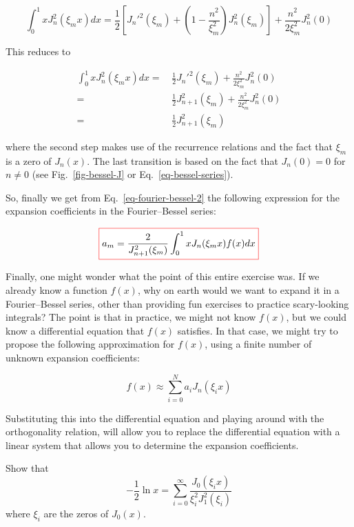\begin{equation}
\int_0^1 x J_n^2(\xi_m x) dx = \frac{1}{2}\left[{J_n'^2(\xi_m) + \left(1 - \frac{n^2}{\xi_m^2}\right) J_n^2(\xi_m)}\right] + \frac{n^2}{2\xi_m^2} J_n^2(0)
\end{equation} 

This reduces to

\begin{align}
\int_0^1 x J_n^2(\xi_m x) dx =& \, \frac{1}{2}J_n'^2(\xi_m) + \frac{n^2}{2\xi_m^2} J_n^2(0) \nonumber \\
 =& \, \frac{1}{2}J_{n+1}^2(\xi_m) + \frac{n^2}{2\xi_m^2} J_n^2(0) \nonumber \\
 =& \, \frac{1}{2}J_{n+1}^2(\xi_m)
\end{align} 

where the second step makes use of the recurrence relations and the fact that $\xi_m$ is a zero of $J_n(x)$. The last transition is based on the fact that $J_n(0)=0$ for $n \ne 0$ (see Fig.~\ref{fig-bessel-J} or Eq.~\ref{eq-bessel-series}).

So, finally we get from Eq.~\ref{eq-fourier-bessel-2} the following expression for the expansion coefficients in the Fourier--Bessel series:

\begin{equation}
\fbox{$\displaystyle
a_m = \frac{2}{J_{n+1}^2(\xi_m)}\int_0^1 x J_n(\xi_m x) f(x) dx
$}
\end{equation} 

Finally, one might wonder what the point of this entire exercise was. If we already know a function $f(x)$, why on earth would we want to expand it in a Fourier--Bessel series, other than providing fun exercises to practice scary-looking integrals? The point is that in practice, we might not know $f(x)$, but we could know a differential equation that $f(x)$ satisfies. In that case, we might try to propose the following approximation for $f(x)$, using a finite number of unknown expansion coefficients:

\begin{equation}
f(x) \approx \sum_{i=0}^{N} a_i J_n(\xi_i x)
\end{equation} 

Substituting this into the differential equation and playing around with the orthogonality relation, will allow you to replace the differential equation with a linear system that allows you to determine the expansion coefficients.

\begin{exer}
Show that
$$-\frac{1}{2} \ln x = \sum_{i=0}^{\infty} \frac{J_0(\xi_i x)}{\xi_i^2 J_1^2(\xi_i)}$$
where $\xi_i$ are the zeros of $J_0(x)$.
\end{exer}



